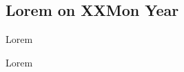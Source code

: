 \documentclass[a4paper, 12pt]{article}
\begin{document}
\subsection {{Lorem on XX}\hfill Mon Year}
\begin{zitemize}
\item Lorem
\item  Lorem
\end{zitemize}
\end{document}
